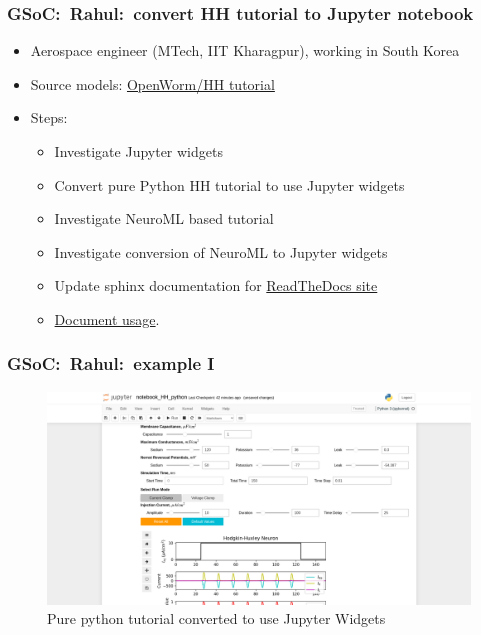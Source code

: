 \begin{frame}[c]
  \frametitle{GSoC:\ Rahul:\ convert HH tutorial to Jupyter notebook}
  \begin{itemize}
    \item Aerospace engineer (MTech, IIT Kharagpur), working in South Korea
      \pause{}
    \item Source models: \href{https://github.com/openworm/hodgkin_huxley_tutorial/}{OpenWorm/HH tutorial}
      \pause{}
    \item Steps:
      \begin{itemize}
        \item Investigate Jupyter widgets
        \item Convert pure Python HH tutorial to use Jupyter widgets
        \item Investigate NeuroML based tutorial
        \item Investigate conversion of NeuroML to Jupyter widgets
        \item Update sphinx documentation for \href{https://hodgkin-huxley-tutorial.readthedocs.io/en/latest/}{ReadTheDocs site}
        \item \href{https://github.com/openworm/hodgkin_huxley_tutorial/blob/master/notebooks/GSoC_2022_Submission/GSoC_Documentation.md}{Document usage}.
      \end{itemize}
  \end{itemize}
\end{frame}
\begin{frame}[c]
  \frametitle{GSoC:\ Rahul:\ example I}
  \begin{figure}[h]
    \centering
    \includegraphics[width=\textwidth]{99_images/20220922-rahul-hh-1}
    \caption{Pure python tutorial converted to use Jupyter Widgets}%
    \label{fig:99_images-20220922-rahul-1}
  \end{figure}
\end{frame}
